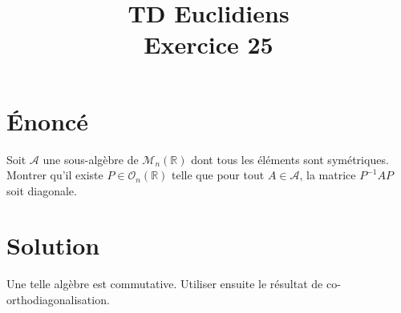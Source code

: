 \documentclass[french]{article}
\title{TD Euclidiens\\ Exercice 25}
\date{}
\newcommand{\R}{\mathbb{R}}
\newcommand{\inv}{^{-1}}
\begin{document}
\maketitle

\section{Énoncé}
Soit $\mathcal{A}$ une sous-algèbre de $\mathcal{M}_n(\R)$ dont tous les éléments sont symétriques. Montrer qu'il existe $P\in\mathcal{O}_n(\R)$ telle que pour tout $A\in\mathcal{A}$, la matrice $P\inv AP$ soit diagonale.
\section{Solution}
Une telle algèbre est commutative. Utiliser ensuite le résultat de co-orthodiagonalisation.
\end{document}
